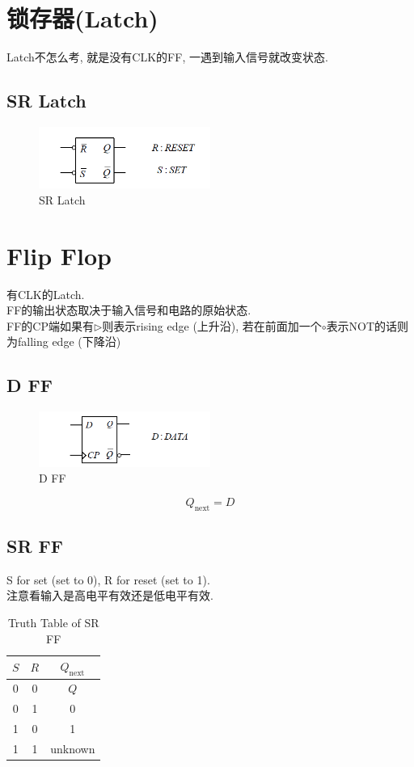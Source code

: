 \documentclass[scheme=chinese,a4paper]{report}
\begin{document}
\section{锁存器(Latch)}
Latch不怎么考, 就是没有CLK的FF, 一遇到输入信号就改变状态. 
\subsection{SR Latch}
\begin{figure}[H]
\centering
\includegraphics[width=0.5\textwidth]{rs_latch.png}
\caption{SR Latch}
\end{figure}


\section{Flip Flop}
有CLK的Latch. \\
FF的输出状态取决于输入信号和电路的原始状态. \\
FF的CP端如果有$\triangleright$则表示rising edge (上升沿), 若在前面加一个$\circ$表示NOT的话则为falling edge (下降沿)
\subsection{D FF}

\begin{figure}[H]
\centering
\includegraphics[width=0.5\textwidth]{d_ff.png}
\caption{D FF}
\end{figure}
$$ Q_\text{next}=D $$
\subsection{SR FF}
S for set (set to 0), R for reset (set to 1). \\
注意看输入是高电平有效还是低电平有效. 
\begin{table}[htb]
    \centering
    \caption{Truth Table of SR FF}
      \begin{tabular}{cc|c}
      \multicolumn{1}{l}{$S$} & \multicolumn{1}{l}{$R$} & $Q_\text{next}$ \\
      \hline
      0     & 0     & $Q$ \\
      0     & 1     & 0\\
      1     & 0     & 1\\
      1     & 1     & unknown \\
      \end{tabular}%
  \end{table}%
  
\end{document}
